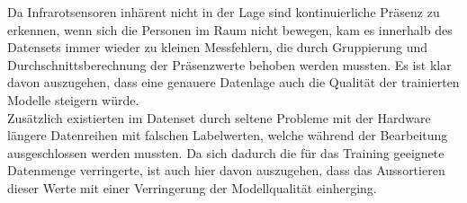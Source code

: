\newpage

Da Infrarotsensoren inhärent nicht in der Lage sind kontinuierliche Präsenz zu erkennen, wenn sich die Personen
im Raum nicht bewegen, kam es innerhalb des Datensets immer wieder zu kleinen Messfehlern, die durch Gruppierung
und Durchschnittsberechnung der Präsenzwerte behoben werden mussten. Es ist klar davon auszugehen, dass eine 
genauere Datenlage auch die Qualität der trainierten Modelle steigern würde.\\
Zusätzlich existierten im Datenset durch seltene Probleme mit der Hardware längere Datenreihen mit falschen 
Labelwerten, welche während der Bearbeitung ausgeschlossen werden mussten. Da sich dadurch die für das Training 
geeignete Datenmenge verringerte, ist auch hier davon auszugehen, dass das Aussortieren dieser Werte
mit einer Verringerung der Modellqualität einherging. 
